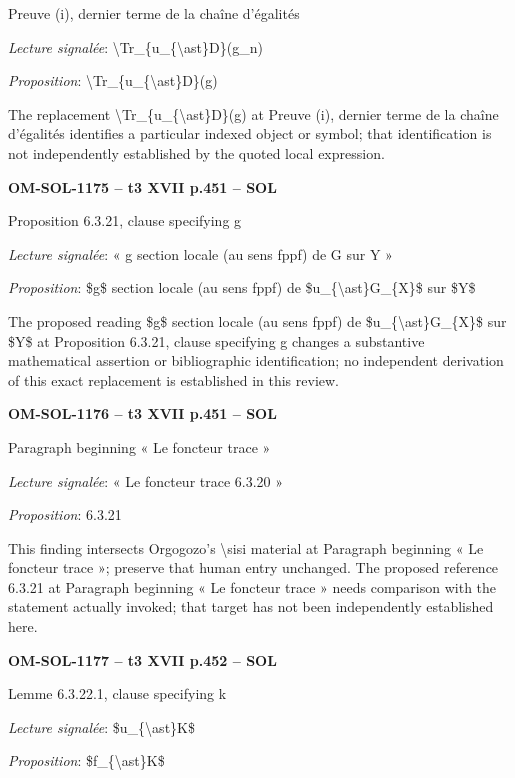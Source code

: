 Preuve (i), dernier terme de la chaîne d'égalités\par
\emph{Lecture signalée}: \textbackslash{}Tr\_\{u\_\{\textbackslash{}ast\}D\}(g\_n)\par
\emph{Proposition}: \textbackslash{}Tr\_\{u\_\{\textbackslash{}ast\}D\}(g)\par
The replacement \textbackslash{}Tr\_\{u\_\{\textbackslash{}ast\}D\}(g) at Preuve (i), dernier terme de la chaîne d'égalités identifies a particular indexed object or symbol; that identification is not independently established by the quoted local expression.\par
\par\noindent\textbf{OM-SOL-1175 -- t3 XVII p.451 -- SOL}\par
Proposition 6.3.21, clause specifying g\par
\emph{Lecture signalée}: « g section locale (au sens fppf) de G sur Y »\par
\emph{Proposition}: \$g\$ section locale (au sens fppf) de \$u\_\{\textbackslash{}ast\}G\_\{X\}\$ sur \$Y\$\par
The proposed reading \$g\$ section locale (au sens fppf) de \$u\_\{\textbackslash{}ast\}G\_\{X\}\$ sur \$Y\$ at Proposition 6.3.21, clause specifying g changes a substantive mathematical assertion or bibliographic identification; no independent derivation of this exact replacement is established in this review.\par
\par\noindent\textbf{OM-SOL-1176 -- t3 XVII p.451 -- SOL}\par
Paragraph beginning « Le foncteur trace »\par
\emph{Lecture signalée}: « Le foncteur trace 6.3.20 »\par
\emph{Proposition}: 6.3.21\par
This finding intersects Orgogozo's \textbackslash{}sisi material at Paragraph beginning « Le foncteur trace »; preserve that human entry unchanged. The proposed reference 6.3.21 at Paragraph beginning « Le foncteur trace » needs comparison with the statement actually invoked; that target has not been independently established here.\par
\par\noindent\textbf{OM-SOL-1177 -- t3 XVII p.452 -- SOL}\par
Lemme 6.3.22.1, clause specifying k\par
\emph{Lecture signalée}: \$u\_\{\textbackslash{}ast\}K\$\par
\emph{Proposition}: \$f\_\{\textbackslash{}ast\}K\$\par
